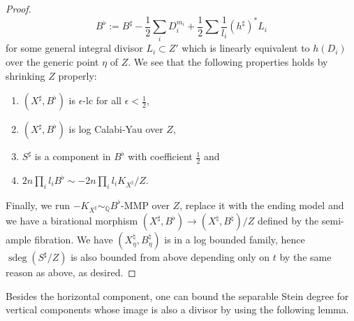 \documentclass[letterpaper,reqno,12pt]{amsart}
\DeclareMathOperator{\sdeg}{sdeg}
\numberwithin{equation}{section}
\theoremstyle{plain}
\begin{document}
\begin{proof}
\[B^\flat:=B^\sharp-\frac{1}{2}\sum\limits_i D_i^{m_i}+\frac{1}{2}\sum\frac{1}{l_i}(h^\sharp)^* L_i\]
for some general integral divisor $L_i\subset Z'$ which is linearly equivalent to $h(D_i)$ over the generic point $\eta$ of $Z$. We see that the following properties holds by shrinking $Z$ properly:
\begin{enumerate}
    \item $(X^\sharp,B^\flat)$ is $\epsilon$-lc for all $\epsilon<\frac{1}{2}$,
    \item $(X^\sharp,B^\flat)$ is log Calabi-Yau over $Z$,
    \item $S^\sharp$ is a component in $B^\flat$ with coefficient $\frac{1}{2}$ and
    \item$2n\prod\limits_il_iB^\flat\sim-2n\prod\limits_il_iK_{X^\sharp}/Z$.
\end{enumerate}
Finally, we run $-K_{X^\sharp}\sim_\mathbb Q B^\flat$-MMP over $Z$, replace it with the ending model and we have a birational morphism $(X^\sharp,B^\flat)\to (X^\natural,B^\natural)/Z$ defined by the semi-ample fibration. We have $(X_\eta^\natural,B_\eta^\natural)$ is in a log bounded family, hence $\sdeg(S^\sharp/Z)$ is also bounded from above depending only on $t$ by the same reason as above, as desired.
\end{proof}








Besides the horizontal component, one can bound the separable Stein degree for vertical components whose image is also a divisor by using the following lemma.
\end{document}
